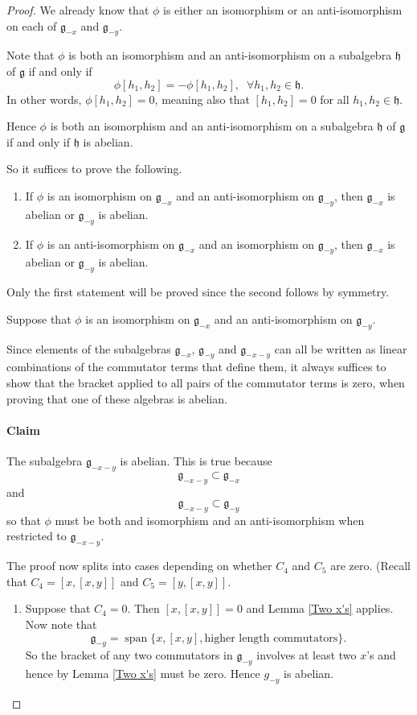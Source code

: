 \documentclass[honours]{UNSWthesis}
\newcommand{\g}{\mathfrak{g}}
\newcommand{\1}{\mathbf{e}_{1}}
\newcommand{\2}{\mathbf{e}_{3}}
\newcommand{\3}{\mathbf{e}_{3}}
\DeclareMathOperator{\spn}{span}
\begin{document}
\begin{proof}
We already know that $\phi$ is either an isomorphism or an anti-isomorphism on each of $\g_{-x}$ and $\g_{-y}$. 

Note that $\phi$ is both an isomorphism and an anti-isomorphism on a subalgebra $\mathfrak{h}$ of $\g$ if and only if 
\[
\phi[h_1,h_2]=-\phi[h_1,h_2],\;\; \forall h_1,h_2 \in \mathfrak{h}.
\]
In other words, $\phi[h_1,h_2]=0$, meaning also that $[h_1,h_2]=0$ for all $h_1,h_2 \in \mathfrak{h}$. 

Hence $\phi$ is both an isomorphism and an anti-isomorphism on a subalgebra $\mathfrak{h}$ of $\g$ if and only if $\mathfrak{h}$ is abelian.

So it suffices to prove the following.
\begin{enumerate}
\item If $\phi$ is an isomorphism on $\g_{-x}$ and an anti-isomorphism on $\g_{-y}$, then $\g_{-x}$ is abelian or $\g_{-y}$ is abelian. 
\item If $\phi$ is an anti-isomorphism on $\g_{-x}$ and an isomorphism on $\g_{-y}$, then $\g_{-x}$ is abelian or $\g_{-y}$ is abelian.
\end{enumerate}

Only the first statement will be proved since the second follows by symmetry.

Suppose that $\phi$ is an isomorphism on $\g_{-x}$ and an anti-isomorphism on $\g_{-y}$.

Since elements of the subalgebras $\g_{-x}$, $\g_{-y}$ and $\g_{-x-y}$ can all be written as linear combinations of the commutator terms that define them, it always suffices to show that the bracket applied to all pairs of the commutator terms is zero, when proving that one of these algebras is abelian. 

\paragraph{Claim}
The subalgebra $\g_{-x-y}$ is abelian. This is true because
\[
\g_{-x-y} \subset \g_{-x}
\]
and 
\[
\g_{-x-y} \subset \g_{-y}
\]
so that $\phi$ must be both and isomorphism and an anti-isomorphism when restricted to $\g_{-x-y}$. 

The proof now splits into cases depending on whether $C_{4}$ and $C_{5}$ are zero. (Recall that $C_4=[x,[x,y]]$ and $C_5 = [y,[x,y]]$.


\begin{enumerate}
\item Suppose that $C_4=0$. Then $[x,[x,y]]=0$ and Lemma \ref{Two x's} applies. Now note that 
\[
\g_{-y} = \spn \{ x, [x,y], \text{higher length commutators}\}.
\]
So the bracket of any two commutators in $\g_{-y}$ involves at least two $x$'s and hence by Lemma \ref{Two x's} must be zero. Hence $g_{-y}$ is abelian. 


\end{enumerate}
\end{proof}
\end{document}
